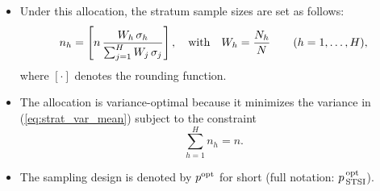\documentclass{my_eth_beamer}
\numberwithin{equation}{section}
\begin{document}
\begin{frame}
    \begin{itemize}
    \setlength{\itemsep}{12pt}
        \item Under this allocation, the stratum sample sizes are set as
            follows:
            \begin{equation}\label{eq:strat_neyman}
                n_h = \left[n \, \frac{W_h \, \sigma_{h}}{\sum_{j=1}^H W_j \,
                \sigma_{j}}\right], \quad \text{with} \quad W_h = \frac{N_{h}}{N}
                \qquad (h = 1, \ldots, H),
            \end{equation}
            \noindent where $[\cdot]$ denotes the rounding function.
        \item The allocation is \alert{variance-optimal} because it minimizes
            the variance in (\ref{eq:strat_var_mean}) subject to the constraint
            \begin{equation*}
                \sum_{h = 1}^H n_h = n.
            \end{equation*}
        \item The sampling design is denoted by $p^{\mathrm{opt}}$ for short
            (full notation: $p_{\,\mathrm{STSI}}^{\,\mathrm{opt}}$).
    \end{itemize}
\end{frame}
\end{document}

